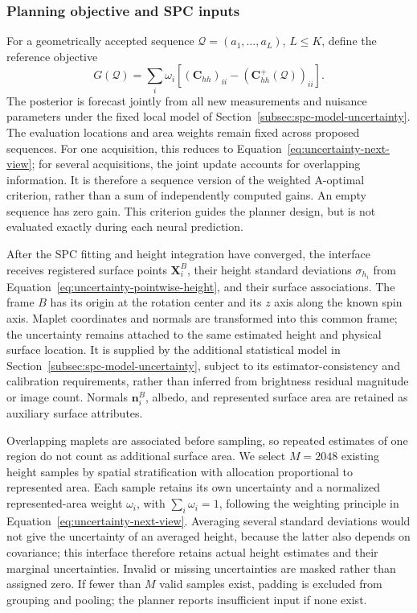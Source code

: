 \subsubsection{Planning objective and SPC inputs}
\label{subsubsec:planner-input}

For a geometrically accepted sequence $\mathcal Q=(a_1,\ldots,a_L)$, $L\leq K$, define the reference objective
\begin{equation}
    G(\mathcal Q)=\sum_i\omega_i
       \left[(\mathbf C_{hh})_{ii}
              -(\mathbf C_{hh}^{+}(\mathcal Q))_{ii}\right].
    \label{eq:planner-sequence-gain}
\end{equation}
The posterior is forecast jointly from all new measurements and nuisance parameters under the fixed local model of Section~\ref{subsec:spc-model-uncertainty}. The evaluation locations and area weights remain fixed across proposed sequences. For one acquisition, this reduces to Equation~\ref{eq:uncertainty-next-view}; for several acquisitions, the joint update accounts for overlapping information. It is therefore a sequence version of the weighted A-optimal criterion, rather than a sum of independently computed gains. An empty sequence has zero gain. This criterion guides the planner design, but is not evaluated exactly during each neural prediction.

After the SPC fitting and height integration have converged, the interface receives registered surface points $\mathbf X_i^B$, their height standard deviations $\sigma_{h_i}$ from Equation~\ref{eq:uncertainty-pointwise-height}, and their surface associations. The frame $B$ has its origin at the rotation center and its $z$ axis along the known spin axis. Maplet coordinates and normals are transformed into this common frame; the uncertainty remains attached to the same estimated height and physical surface location. It is supplied by the additional statistical model in Section~\ref{subsec:spc-model-uncertainty}, subject to its estimator-consistency and calibration requirements, rather than inferred from brightness residual magnitude or image count. Normals $\mathbf n_i^B$, albedo, and represented surface area are retained as auxiliary surface attributes.

Overlapping maplets are associated before sampling, so repeated estimates of one region do not count as additional surface area. We select $M=2048$ existing height samples by spatial stratification with allocation proportional to represented area. Each sample retains its own uncertainty and a normalized represented-area weight $\omega_i$, with $\sum_i\omega_i=1$, following the weighting principle in Equation~\ref{eq:uncertainty-next-view}. Averaging several standard deviations would not give the uncertainty of an averaged height, because the latter also depends on covariance; this interface therefore retains actual height estimates and their marginal uncertainties. Invalid or missing uncertainties are masked rather than assigned zero. If fewer than $M$ valid samples exist, padding is excluded from grouping and pooling; the planner reports insufficient input if none exist.

